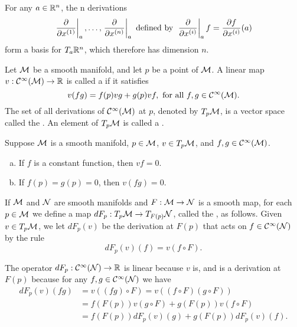 \documentclass[11pt,a4paper]{article}
\begin{document}
\begin{corollary}
For any $a\in \mathbb{R}^n$, the n derivations
$$
\left.\dfrac{\partial}{\partial x^{(1)}}\right|_{a},\ldots, \left.\dfrac{\partial}{\partial x^{(n)}}\right|_{a} \text{ defined by } \left.\dfrac{\partial}{\partial x^{(i)}}\right|_{a} f = \dfrac{\partial f}{\partial x^{(i)}}(a)
$$
form a basis for $T_a\mathbb{R}^n$, which therefore has dimension $n$.
\end{corollary}

\begin{definition}
Let $\mathcal{M}$ be a smooth manifold, and let $p$ be a point of $\mathcal{M}$. A linear map $v:\mathcal{C}^\infty(\mathcal{M})\rightarrow \mathbb{R}$ is called a  if it satisfies
\begin{equation*}
    v(fg) = f(p)vg + g(p) vf, \text{ for all } f,g\in \mathcal{C}^\infty(\mathcal{M}).
\end{equation*}
The set of all derivations of $\mathcal{C}^\infty(\mathcal{M})$ at $p$, denoted by $T_p\mathcal{M}$, is a vector space called the . An element of $T_p\mathcal{M}$ is called a .
\end{definition}

\begin{lemma}
Suppose $\mathcal{M}$ is a smooth manifold, $p \in\mathcal{M}$, $v \in T_p\mathcal{M}$, and $f, g \in\mathcal{C}^\infty(\mathcal{M})$.
\begin{enumerate}[(a)]
    \item If $f$ is a constant function, then $vf = 0$.
    \item If $f(p) = g(p) = 0$, then $v(fg) = 0$.
\end{enumerate}
\end{lemma}

\begin{definition}
If $\mathcal{M}$ and $\mathcal{N}$ are smooth manifolds and $F:\mathcal{M}\rightarrow \mathcal{N}$ is a smooth map, for each $p\in\mathcal{M}$ we define a map $dF_p:T_p\mathcal{M}\rightarrow T_{F(p)}\mathcal{N}$, called the , as follows. Given $v \in T_p\mathcal{M}$, we let $dF_p(v)$ be the derivation at $F(p)$ that acts on $f\in\mathcal{C}^\infty(\mathcal{N})$ by the rule
\begin{equation*}
    dF_p(v)(f) = v(f \circ F).
\end{equation*}
\end{definition}

\begin{remark}
The operator $dF_p:\mathcal{C}^\infty(\mathcal{N})\rightarrow \mathbb{R}$ is linear because $v$ is, and is a derivation at $F(p)$ because for any $f, g\in \mathcal{C}^\infty(\mathcal{N})$ we have
\begin{align*}
dF_p(v)(fg) 
&= v((fg)\circ F) = v((f\circ F)(g\circ F)) \\
&= f(F(p))v(g\circ F) + g(F(p)) v(f\circ F) \\
&= f(F(p))dF_p(v)(g) + g(F(p)) dF_p(v)(f).
\end{align*}
\end{remark}
\end{document}
